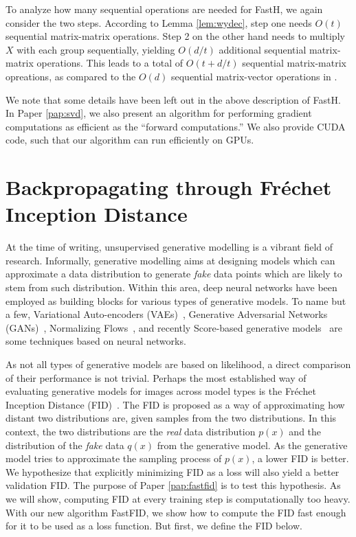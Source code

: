 \documentclass[11pt,a4paper,twoside,openright,final]{memoir}
\newcommand\contribution[1]{\hspace{0.5em}\hyperref[#1]{\ding{81}}}
\newcommand*{\paperref}[1]{Paper \hyperref[#1]{\ref{#1}}}
\begin{document}
To analyze how many sequential operations are needed for FastH, we again consider the two steps.
According to Lemma \ref{lem:wydec}, step one needs $O(t)$ sequential matrix-matrix operations.
Step 2 on the other hand needs to multiply $X$ with each group sequentially, yielding $O(d/t)$ additional sequential matrix-matrix operations.
This leads to a total of $O(t + d/t)$ sequential matrix-matrix opreations, as compared to the $O(d)$ sequential matrix-vector operations in \cite{sequential}. 

We note that some details have been left out in the above description of FastH. 
In \paperref{pap:svd}, we also present an algorithm for performing gradient computations as efficient as the ``forward computations.''
We also provide CUDA code, such that our algorithm can run efficiently on GPUs.

\section{Backpropagating through Fr\'echet Inception Distance\contribution{pap:fastfid}} \label{sec:fid}
At the time of writing, unsupervised generative modelling is a vibrant field of research.
Informally, generative modelling aims at designing models which can approximate a data distribution to generate \emph{fake} data points which are likely to stem from such distribution.
Within this area, deep neural networks have been employed as building blocks for various types of generative models.
To name but a few, Variational Auto-encoders (VAEs)~\cite{vae}, Generative Adversarial Networks (GANs)~\cite{gans}, Normalizing Flows~\cite{nice}, and recently Score-based generative models~\cite{sgm} are some techniques based on neural networks.

As not all types of generative models are based on likelihood, a direct comparison of their performance is not trivial.
Perhaps the most established way of evaluating generative models for images across model types is the Fr\'echet Inception Distance (FID)~\cite{fid, fid-comparison}. 
The FID is proposed as a way of approximating how distant two distributions are, given samples from the two distributions. 
In this context, the two distributions are the \emph{real} data distribution $p(x)$ and the distribution of the \emph{fake} data $q(x)$ from the generative model.
As the generative model tries to approximate the sampling process of $p(x)$, a lower FID is better.
We hypothesize that explicitly minimizing FID as a loss will also yield a better validation FID.
The purpose of \paperref{pap:fastfid} is to test this hypothesis.
As we will show, computing FID at every training step is computationally too heavy.
With our new algorithm FastFID, we show how to compute the FID fast enough for it to be used as a loss function. 
But first, we define the FID below.
\end{document}
